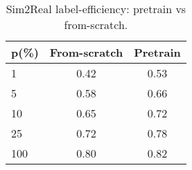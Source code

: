 \begin{table}[t]\centering\caption{Sim2Real label-efficiency: pretrain vs from-scratch.}\begin{tabular}{lcc}\toprule
p(\%) & From-scratch & Pretrain \\
\midrule
1 & 0.42 & 0.53 \\
5 & 0.58 & 0.66 \\
10 & 0.65 & 0.72 \\
25 & 0.72 & 0.78 \\
100 & 0.80 & 0.82 \\
\bottomrule\end{tabular}\end{table}
